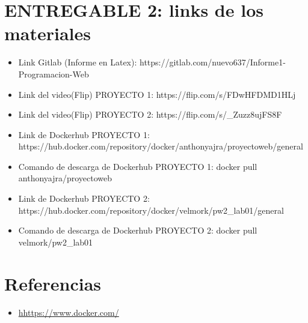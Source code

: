 \documentclass{article}
\begin{document}
\section{ENTREGABLE 2: links de los materiales}
    \begin{itemize}	
    
    \item Link Gitlab (Informe en Latex): https://gitlab.com/nuevo637/Informe1-Programacion-Web
    
    \item Link del video(Flip) PROYECTO 1: https://flip.com/s/FDwHFDMD1HLj
    
    \item Link del video(Flip) PROYECTO 2: https://flip.com/s/_Zuzz8ujFS8F
    
    \item Link de Dockerhub PROYECTO 1: https://hub.docker.com/repository/docker/anthonyajra/proyectoweb/general
    
    \item Comando de descarga de Dockerhub PROYECTO 1:  docker pull anthonyajra/proyectoweb
    
    \item Link de Dockerhub PROYECTO 2: https://hub.docker.com/repository/docker/velmork/pw2_lab01/general
    
    \item Comando de descarga de Dockerhub PROYECTO 2: docker pull velmork/pw2_lab01
\end{itemize}











   
\section{Referencias}
\begin{itemize}			
	\item \url{hhttps://www.docker.com/}
\end{itemize}	
	
%
%
%
			
\end{document}

